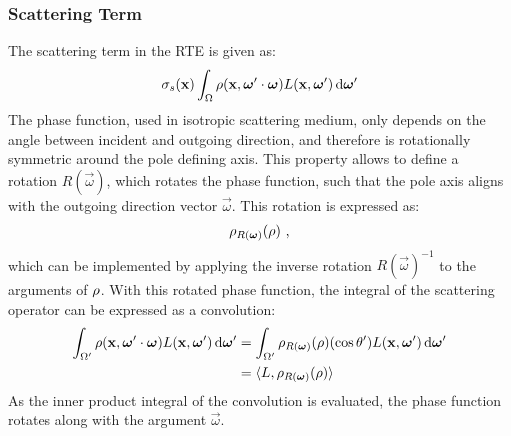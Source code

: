 \subsubsection*{Scattering Term}

The scattering term in the RTE is given as:
\begin{align*}
\sigma_s(\boldsymbol{\mathbf{x}})\int_{\Omega}\rho(\boldsymbol{\mathbf{x}}, \boldsymbol{\mathbf{\omega}}'\cdot\boldsymbol{\mathbf{\omega}})L(\boldsymbol{\mathbf{x}}, \boldsymbol{\mathbf{\omega}}')\,\mathrm{d}\boldsymbol{\mathbf{\omega}}'
\end{align*}
The phase function, used in isotropic scattering medium, only depends on the angle between incident and outgoing direction, and therefore is rotationally symmetric around the pole defining axis. This property allows to define a rotation $R(\vec{\omega})$, which rotates the phase function, such that the pole axis aligns with the outgoing direction vector $\vec{\omega}$. This rotation is expressed as:
\begin{align*}
\rho_{R(\boldsymbol{\mathbf{\omega}})}(\rho)
\ ,
\end{align*}
which can be implemented by applying the inverse rotation $R(\vec{\omega})^{-1}$ to the arguments of $\rho$. With this rotated phase function, the integral of the scattering operator can be expressed as a convolution:
\begin{align}
\int_{\Omega'}\rho(\boldsymbol{\mathbf{x}}, \boldsymbol{\mathbf{\omega}}'\cdot\boldsymbol{\mathbf{\omega}})L(\boldsymbol{\mathbf{x}}, \boldsymbol{\mathbf{\omega}}')\,\mathrm{d}\boldsymbol{\mathbf{\omega}}'
&=
\int_{\Omega'}{\rho_{R(\boldsymbol{\mathbf{\omega}})}(\rho)(\operatorname{cos}\theta')L(\boldsymbol{\mathbf{x}}, \boldsymbol{\mathbf{\omega}}')\,\mathrm{d}\boldsymbol{\mathbf{\omega}}'}
\nonumber\\
&= \langle L,  \rho_{R(\boldsymbol{\mathbf{\omega}})}(\rho)\rangle
\label{eq:complex_scatt_conv}
\end{align}
As the inner product integral of the convolution is evaluated, the phase function rotates along with the argument $\vec{\omega}$.

